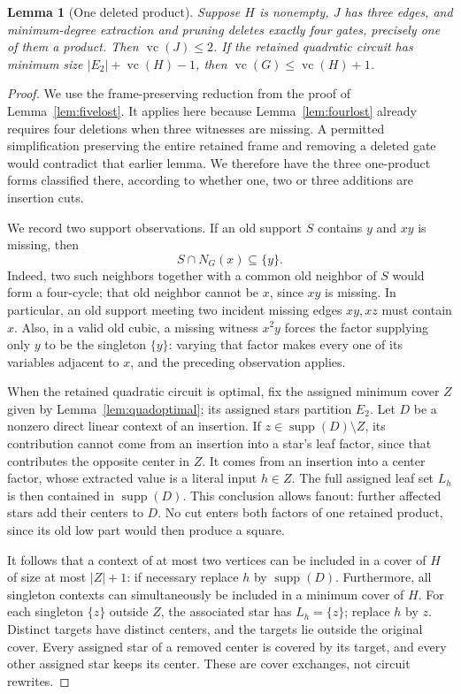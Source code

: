 \documentclass[11pt]{article}
\newcommand{\supp}{\operatorname{supp}}
\newcommand{\vc}{\operatorname{vc}}
\newtheorem{lemma}[theorem]{Lemma}
\theoremstyle{definition}
\theoremstyle{remark}
\begin{document}
\begin{lemma}[One deleted product]\label{lem:oneproductcover}
Suppose $H$ is nonempty, $J$ has three edges, and minimum-degree extraction and pruning deletes exactly four gates, precisely one of them a product. Then $\vc(J)\le2$. If the retained quadratic circuit has minimum size $|E_2|+\vc(H)-1$, then $\vc(G)\le\vc(H)+1$.
\end{lemma}
\begin{proof}
We use the frame-preserving reduction from the proof of Lemma~\ref{lem:fivelost}. It applies here because Lemma~\ref{lem:fourlost} already requires four deletions when three witnesses are missing. A permitted simplification preserving the entire retained frame and removing a deleted gate would contradict that earlier lemma. We therefore have the three one-product forms classified there, according to whether one, two or three additions are insertion cuts.

We record two support observations. If an old support $S$ contains $y$ and $xy$ is missing, then
\[
 S\cap N_G(x)\subseteq\{y\}.
\]
Indeed, two such neighbors together with a common old neighbor of $S$ would form a four-cycle; that old neighbor cannot be $x$, since $xy$ is missing. In particular, an old support meeting two incident missing edges $xy,xz$ must contain $x$. Also, in a valid old cubic, a missing witness $x^2y$ forces the factor supplying only $y$ to be the singleton $\{y\}$: varying that factor makes every one of its variables adjacent to $x$, and the preceding observation applies.

When the retained quadratic circuit is optimal, fix the assigned minimum cover $Z$ given by Lemma~\ref{lem:quadoptimal}; its assigned stars partition $E_2$. Let $D$ be a nonzero direct linear context of an insertion. If $z\in\supp(D)\setminus Z$, its contribution cannot come from an insertion into a star's leaf factor, since that contributes the opposite center in $Z$. It comes from an insertion into a center factor, whose extracted value is a literal input $h\in Z$. The full assigned leaf set $L_h$ is then contained in $\supp(D)$. This conclusion allows fanout: further affected stars add their centers to $D$. No cut enters both factors of one retained product, since its old low part would then produce a square.

It follows that a context of at most two vertices can be included in a cover of $H$ of size at most $|Z|+1$: if necessary replace $h$ by $\supp(D)$. Furthermore, all singleton contexts can simultaneously be included in a minimum cover of $H$. For each singleton $\{z\}$ outside $Z$, the associated star has $L_h=\{z\}$; replace $h$ by $z$. Distinct targets have distinct centers, and the targets lie outside the original cover. Every assigned star of a removed center is covered by its target, and every other assigned star keeps its center. These are cover exchanges, not circuit rewrites.


\end{proof}
\end{document}
